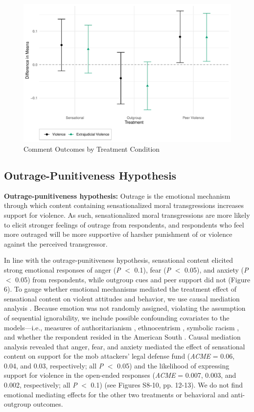 \begin{figure}[!htbp]
  \centering
  \caption{Comment Outcomes by Treatment Condition}
  \includegraphics[width=.835\textwidth]{figures/ATE_com_heckman.pdf}
\end{figure}

\subsection{Outrage-Punitiveness Hypothesis}

\vspace{1em}
\noindent\textbf{Outrage-punitiveness hypothesis:} Outrage is the emotional mechanism through which content containing sensationalized moral transgressions increases support for violence. As such, sensationalized moral transgressions are more likely to elicit stronger feelings of outrage from respondents, and respondents who feel more outraged will be more supportive of harsher punishment of or violence against the perceived transgressor.
\vspace{1em}

In line with the outrage-punitiveness hypothesis, sensational content elicited strong emotional responses of anger (\textit{P} $<$ 0.1), fear (\textit{P} $<$ 0.05), and anxiety (\textit{P} $<$ 0.05) from respondents, while outgroup cues and peer support did not (Figure 6). To gauge whether emotional mechanisms mediated the treatment effect of sensational content on violent attitudes and behavior, we use causal mediation analysis \citep{imai2011commentary}. Because emotion was not randomly assigned, violating the assumption of sequential ignorability, we include possible confounding covariates to the models---i.e., measures of authoritarianism \citep{stenner2005authoritarian}, ethnocentrism \citep{kinder2010us}, symbolic racism \citep{banks2014anger}, and whether the respondent resided in the American South \citep{nisbett1996culture}. Causal mediation analysis revealed that anger, fear, and anxiety mediated the effect of sensational content on support for the mob attackers' legal defense fund (\textit{ACME} = 0.06, 0.04, and 0.03, respectively; all \textit{P} $<$ 0.05) and the likelihood of expressing support for violence in the open-ended responses (\textit{ACME} = 0.007, 0.003, and 0.002, respectively; all \textit{P} $<$ 0.1) (see Figures S8-10, pp. 12-13). We do not find emotional mediating effects for the other two treatments or behavioral and anti-outgroup outcomes.

